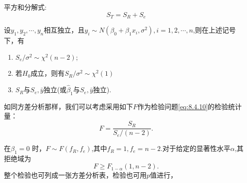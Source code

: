 平方和分解式:
\begin{equation}
    S_T = S_R + S_e
\end{equation}

\begin{theorem}
    设$y_1,y_2,\cdots,y_n$相互独立，且$y_i\sim N(\beta_0+\beta_1x_i,\sigma^2),i=1,2,\cdots,n$,则在上述记号下，有
    \begin{enumerate}
        \item $S_{e}/\sigma^{2} \sim \chi^{2}( n-2)$;
        \item 若$H_{0}$成立，则有$S_{R}/\sigma^{2} \sim \chi^{2}(1)$
        \item $S_R$与$S_e,\bar{y}$独立(或$\hat{\beta}_1$与$S_e,\bar{y}$独立).
    \end{enumerate}

\end{theorem}
如同方差分析那样，我们可以考虑采用如下$F$作为检验问题\eqref{eq:8.4.10}的检验统计量：
$$F=\frac{S_{R}}{S_{e}/(n-2)}.$$

在$\beta_{1}=0$ 时，$F\sim F(f_{R},f_{e})$,其中$f_{R}=1,f_{e}=n-2$.对于给定的显著性水平$\alpha$,其拒绝域为
$$
F\geq F_{1-\alpha}(1,n-2).
$$
整个检验也可列成一张方差分析表，检验也可用$p$值进行，


